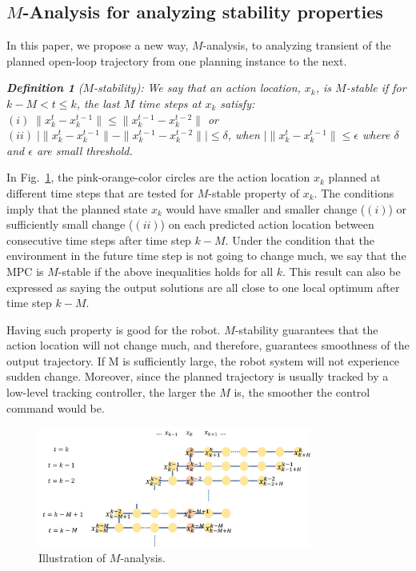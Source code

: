 \documentclass[letterpaper, 10 pt, conference]{ieeeconf}  %
\begin{document}
\subsection{$M$-Analysis for analyzing stability properties}
In this paper, we propose a new way, $M$-analysis, to analyzing transient of the planned open-loop trajectory from one planning instance to the next.

\textbf{\textit{Definition 1}} \textit{($M$-stability):}
\textit{We say that an action location, $x_{k}$, is $M$-stable if for $k-M< t\leq k$, the last $M$ time steps at $x_{k}$ satisfy: $(i) \;\|x_{k}^t-x_k^{t-1}\|\leq \|x_k^{t-1}-x_k^{t-2}\|$ or $(ii) \;\bigl|\|x_{k}^t-x_k^{t-1}\|-\|x_k^{t-1}-x_k^{t-2}\|\bigr|\leq \delta$, when $\bigl|\|x_{k}^t-x_k^{t-1}\|\leq \epsilon$ where $\delta$ and $\epsilon$ are small threshold.}


In Fig.~\ref{fig:m-stable}, the pink-orange-color circles are the action location $x_{k}$ planned at different time steps that are  tested for $M$-stable property of $x_{k}$. The conditions imply that the planned state $x_k$ would have smaller and smaller change ($(i)$) or sufficiently small change ($(ii)$) on each predicted action location between consecutive time steps after time step $k-M$. Under the condition that the environment in the future time step is not going to change much, we say that the MPC is $M$-stable if the above inequalities holds for all $k$. This result can also be expressed as saying the output solutions are all close to one local optimum after time step $k-M$. 

Having such property is good for the robot. $M$-stability guarantees that the action location will not change much, and therefore, guarantees smoothness of the output trajectory. If M is sufficiently large, the robot system will not experience sudden change. Moreover, since the planned trajectory is usually tracked by a low-level tracking controller, the larger the $M$ is, the smoother the control command would be.

\begin{figure}[t]
\begin{center}
\includegraphics[width=9cm]{src/Mstable.png}
\caption{Illustration of $M$-analysis.}
\label{fig:m-stable}
\end{center}
\end{figure}
\end{document}
